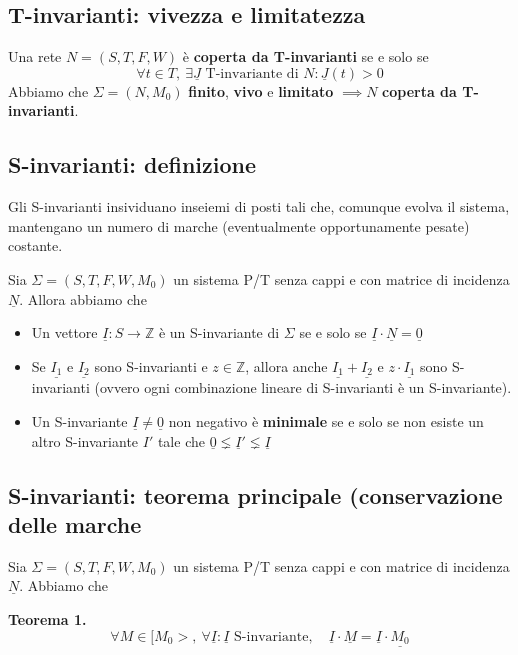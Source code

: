 \subsection{T-invarianti: vivezza e limitatezza}

Una rete $N = (S, T, F, W)$ è \textbf{coperta da T-invarianti} se e solo se
\[
	\forall t \in T, \ \exists \underline J \text{ T-invariante di } N : \underline J(t) > 0
\]
Abbiamo che $\Sigma = (N, M_0)$ \textbf{finito}, \textbf{vivo} e \textbf{limitato} $\implies N$ \textbf{coperta da T-invarianti}.

\subsection{S-invarianti: definizione}

Gli S-invarianti insividuano inseiemi di posti tali che, comunque evolva il sistema, mantengano un numero di marche (eventualmente opportunamente pesate) costante.

Sia $\Sigma = (S, T, F, W, M_0)$ un sistema P/T senza cappi e con matrice di incidenza $\underline N$. Allora abbiamo che
\begin{itemize}
	\item Un vettore $\underline I : S \to \mathbb Z$ è un S-invariante di $\Sigma$ se e solo se $\underline I \cdot \underline N = \underline 0$
	\item Se $\underline{I_1}$ e $\underline{I_2}$ sono S-invarianti e $z \in \mathbb Z$, allora anche $\underline{I_1} + \underline{I_2}$ e $z \cdot \underline {I_1}$ sono S-invarianti (ovvero ogni combinazione lineare di S-invarianti è un S-invariante).
	\item Un S-invariante $\underline I \neq \underline 0$ non negativo è \textbf{minimale} se e solo se non esiste un altro S-invariante $I'$ tale che $\underline 0 \lneq \underline I' \lneq \underline I$
\end{itemize}

\subsection{S-invarianti: teorema principale (conservazione delle marche}

Sia $\Sigma = (S, T, F, W, M_0)$ un sistema P/T senza cappi e con matrice di incidenza $\underline N$. Abbiamo che

\textbf{Teorema 1.}
\[
    \forall M \in [M_0>, \ \forall \underline I : \underline I \text{ S-invariante}, \quad \underline I \cdot \underline M = \underline I \cdot \underline{M_0}
\]

